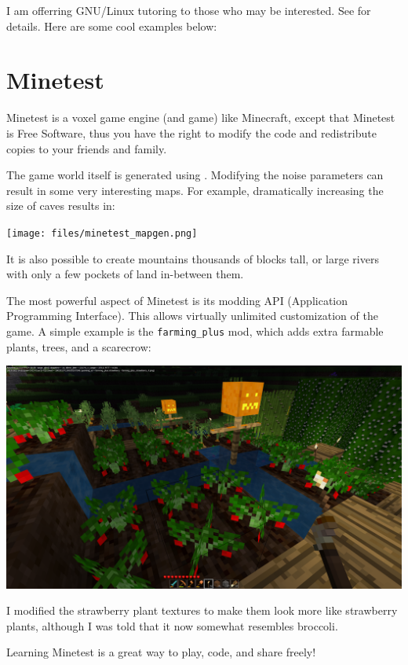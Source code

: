 \documentclass{article}
\begin{document}
I am offerring GNU/Linux tutoring to those who may be interested.  See  for details.  Here are some cool examples below:

\section{Minetest}
Minetest is a voxel game engine (and game) like Minecraft, except that Minetest is Free Software, thus you have the right to modify the code and redistribute copies to your friends and family.

The game world itself is generated using .  Modifying the noise parameters can result in some very interesting maps.  For example, dramatically increasing the size of caves results in:
\begin{center}
\texttt{[image: files/minetest\_mapgen.png]}
\end{center}
It is also possible to create mountains thousands of blocks tall, or large rivers with only a few pockets of land in-between them.

The most powerful aspect of Minetest is its modding API (Application Programming Interface).  This allows virtually unlimited customization of the game.  A simple example is the \texttt{farming\_plus} mod, which adds extra farmable plants, trees, and a scarecrow:
\begin{center}
\includegraphics[scale=0.25]{files/minetest_farming.png}
\end{center}
I modified the strawberry plant textures to make them look more like strawberry plants, although I was told that it now somewhat resembles broccoli.

Learning Minetest is a great way to play, code, and share freely!
\end{document}
